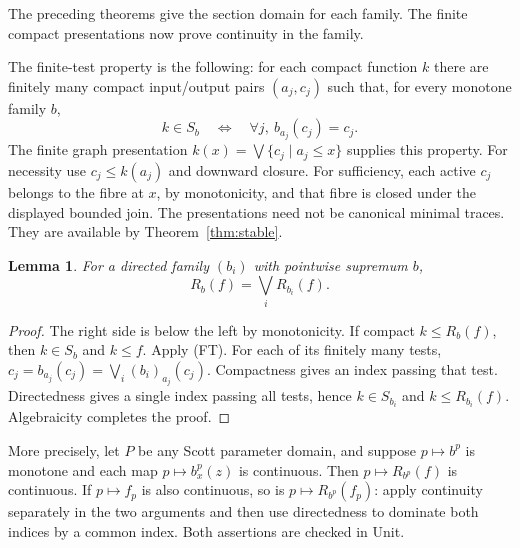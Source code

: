 \documentclass[11pt]{article}
\newtheorem{lemma}[theorem]{Lemma}
\begin{document}
The preceding theorems give the section domain for each family.
The finite compact presentations now prove continuity in the family.

The finite-test property is the following: for each compact
function $k$ there are finitely many compact input/output pairs
$(a_j,c_j)$ such that, for every monotone family $b$,
\[
 k\in S_b\quad\Longleftrightarrow\quad
 \forall j,\ b_{a_j}(c_j)=c_j.                 \tag{FT}
\]
The finite graph presentation
$k(x)=\bigvee\{c_j\mid a_j\le x\}$ supplies this property. For necessity
use $c_j\le k(a_j)$ and downward closure. For sufficiency, each active
$c_j$ belongs to the fibre at $x$, by monotonicity, and that fibre is
closed under the displayed bounded join. The presentations need not be
canonical minimal traces. They are available by Theorem~\ref{thm:stable}.

\begin{lemma}
For a directed family $(b_i)$ with pointwise supremum $b$,
\[
 R_b(f)=\bigvee_i R_{b_i}(f).
\]
\end{lemma}
\begin{proof}
The right side is below the left by monotonicity. If compact
$k\le R_b(f)$, then $k\in S_b$ and $k\le f$. Apply (FT). For each of its
finitely many tests,
$c_j=b_{a_j}(c_j)=\bigvee_i(b_i)_{a_j}(c_j)$.
Compactness gives an index passing that test. Directedness gives a
single index passing all tests, hence $k\in S_{b_i}$ and
$k\le R_{b_i}(f)$. Algebraicity completes the proof.
\end{proof}

More precisely, let $P$ be any Scott parameter domain, and suppose
$p\mapsto b^p$ is monotone and each map
$p\mapsto b^p_x(z)$ is continuous. Then $p\mapsto R_{b^p}(f)$ is
continuous. If $p\mapsto f_p$ is also continuous, so is
$p\mapsto R_{b^p}(f_p)$: apply continuity separately in the two arguments
and then use directedness to dominate both indices by a common index.
Both assertions are checked in Unit.
\end{document}
